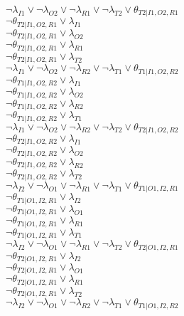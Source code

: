 $\neg\lambda_{I1} \vee \neg\lambda_{O2} \vee \neg\lambda_{R1} \vee \neg\lambda_{T2} \vee \theta_{T2|I1,O2,R1}$\\
$\neg\theta_{T2|I1,O2,R1} \vee \lambda_{I1}$\\
$\neg\theta_{T2|I1,O2,R1} \vee \lambda_{O2}$\\
$\neg\theta_{T2|I1,O2,R1} \vee \lambda_{R1}$\\
$\neg\theta_{T2|I1,O2,R1} \vee \lambda_{T2}$\\
$\neg\lambda_{I1} \vee \neg\lambda_{O2} \vee \neg\lambda_{R2} \vee \neg\lambda_{T1} \vee \theta_{T1|I1,O2,R2}$\\
$\neg\theta_{T1|I1,O2,R2} \vee \lambda_{I1}$\\
$\neg\theta_{T1|I1,O2,R2} \vee \lambda_{O2}$\\
$\neg\theta_{T1|I1,O2,R2} \vee \lambda_{R2}$\\
$\neg\theta_{T1|I1,O2,R2} \vee \lambda_{T1}$\\
$\neg\lambda_{I1} \vee \neg\lambda_{O2} \vee \neg\lambda_{R2} \vee \neg\lambda_{T2} \vee \theta_{T2|I1,O2,R2}$\\
$\neg\theta_{T2|I1,O2,R2} \vee \lambda_{I1}$\\
$\neg\theta_{T2|I1,O2,R2} \vee \lambda_{O2}$\\
$\neg\theta_{T2|I1,O2,R2} \vee \lambda_{R2}$\\
$\neg\theta_{T2|I1,O2,R2} \vee \lambda_{T2}$\\
$\neg\lambda_{I2} \vee \neg\lambda_{O1} \vee \neg\lambda_{R1} \vee \neg\lambda_{T1} \vee \theta_{T1|O1,I2,R1}$\\
$\neg\theta_{T1|O1,I2,R1} \vee \lambda_{I2}$\\
$\neg\theta_{T1|O1,I2,R1} \vee \lambda_{O1}$\\
$\neg\theta_{T1|O1,I2,R1} \vee \lambda_{R1}$\\
$\neg\theta_{T1|O1,I2,R1} \vee \lambda_{T1}$\\
$\neg\lambda_{I2} \vee \neg\lambda_{O1} \vee \neg\lambda_{R1} \vee \neg\lambda_{T2} \vee \theta_{T2|O1,I2,R1}$\\
$\neg\theta_{T2|O1,I2,R1} \vee \lambda_{I2}$\\
$\neg\theta_{T2|O1,I2,R1} \vee \lambda_{O1}$\\
$\neg\theta_{T2|O1,I2,R1} \vee \lambda_{R1}$\\
$\neg\theta_{T2|O1,I2,R1} \vee \lambda_{T2}$\\
$\neg\lambda_{I2} \vee \neg\lambda_{O1} \vee \neg\lambda_{R2} \vee \neg\lambda_{T1} \vee \theta_{T1|O1,I2,R2}$\\
